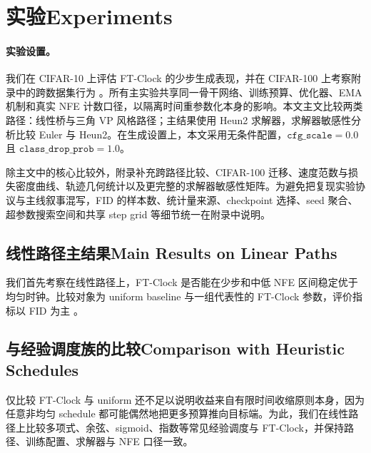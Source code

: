 \section{\ifinternalcn 实验\else Experiments\fi}

\ifinternalcn
\paragraph{实验设置。}
我们在 CIFAR-10 上评估 FT-Clock 的少步生成表现，并在 CIFAR-100 上考察附录中的跨数据集行为 \citep{krizhevsky2009learning}。所有主实验共享同一骨干网络、训练预算、优化器、EMA 机制和真实 NFE 计数口径，以隔离时间重参数化本身的影响。本文主文比较两类路径：线性桥与三角 VP 风格路径；主结果使用 Heun2 求解器，求解器敏感性分析比较 Euler 与 Heun2。在生成设置上，本文采用无条件配置，$\texttt{cfg\_scale}=0.0$ 且 $\texttt{class\_drop\_prob}=1.0$。

除主文中的核心比较外，附录补充跨路径比较、CIFAR-100 迁移、速度范数与损失密度曲线、轨迹几何统计以及更完整的求解器敏感性矩阵。为避免把复现实验协议与主线叙事混写，FID 的样本数、统计量来源、checkpoint 选择、seed 聚合、超参数搜索空间和共享 step grid 等细节统一在附录中说明。

\subsection{\ifinternalcn 线性路径主结果\else Main Results on Linear Paths\fi}
我们首先考察在线性路径上，FT-Clock 是否能在少步和中低 NFE 区间稳定优于均匀时钟。比较对象为 uniform baseline 与一组代表性的 FT-Clock 参数，评价指标以 FID 为主 \citep{heusel2017fid}。

\subsection{\ifinternalcn 与经验调度族的比较\else Comparison with Heuristic Schedules\fi}
仅比较 FT-Clock 与 uniform 还不足以说明收益来自有限时间收缩原则本身，因为任意非均匀 schedule 都可能偶然地把更多预算推向目标端。为此，我们在线性路径上比较多项式、余弦、sigmoid、指数等常见经验调度与 FT-Clock，并保持路径、训练配置、求解器与 NFE 口径一致。

